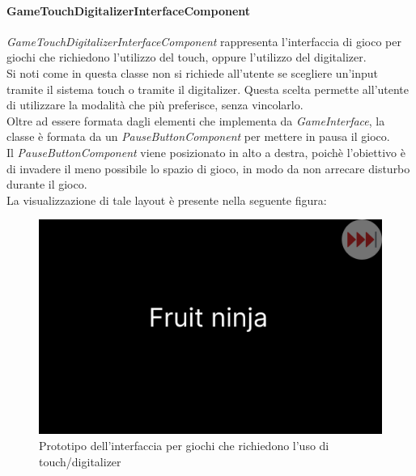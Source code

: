 \paragraph{GameTouchDigitalizerInterfaceComponent}
\emph{GameTouchDigitalizerInterfaceComponent} rappresenta l'interfaccia di gioco per giochi che richiedono l'utilizzo del touch, oppure l'utilizzo del digitalizer.\\
Si noti come in questa classe non si richiede all'utente se scegliere un'input tramite il sistema touch o tramite il digitalizer. Questa scelta permette all'utente di utilizzare la modalità che più preferisce, senza vincolarlo.\\
Oltre ad essere formata dagli elementi che implementa da \emph{GameInterface}, la classe è formata da un \emph{PauseButtonComponent} per mettere in pausa il gioco.\\
Il \emph{PauseButtonComponent} viene posizionato in alto a destra, poichè l'obiettivo è di invadere il meno possibile lo spazio di gioco, in modo da non arrecare disturbo durante il gioco.\\
La visualizzazione di tale layout è presente nella seguente figura:
\begin{figure}[h]
    \centering
    \includegraphics[width=340pt]{images/prog/TouchDigitMockup.png}
    \caption{Prototipo dell'interfaccia per giochi che richiedono l'uso di touch/digitalizer}
    \label{fig:touchDigit}
\end{figure}
\newpage
